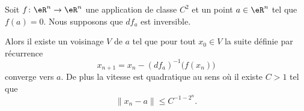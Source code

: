 \begin{theorem}\label{ThoHGpGwXk}
    Soit \( f\colon \eR^n\to \eR^n\) une application de classe \( C^2\) et un point \( a\in \eR^n\) tel que \( f(a)=0\). Nous supposons que \( df_a\) est inversible.

    Alors il existe un voisinage \( V\) de \( a\) tel que pour tout \( x_0\in V\) la suite définie par récurrence
    \begin{equation}
        x_{n+1}=x_n-(df_a)^{-1}\big( f(x_n) \big)
    \end{equation}
    converge vers \( a\). De plus la vitesse est quadratique au sens où il existe \( C>1\) tel que 
    \begin{equation}        \label{EqtkiDXt}
        \| x_n-a \|\leq C^{-1-2^n}.
    \end{equation}
\end{theorem}

